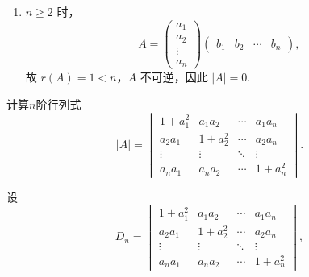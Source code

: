 \begin{exercise}
\begin{exgroup}
\begin{answer}
\begin{enumerate}
                \item $n \geqslant 2$ 时，
                    \[
                        A = \begin{pmatrix}
                            a_1 \\ a_2 \\ \vdots \\ a_n
                        \end{pmatrix} \begin{pmatrix}
                            b_1 & b_2 & \cdots & b_n
                        \end{pmatrix},
                    \]
                    故 $r(A) = 1 < n$，$A$ 不可逆，因此 $|A| = 0$.
            \end{enumerate}
        \end{answer}

        \item 计算$n$阶行列式
        \[|A|=\begin{vmatrix}
                1+a_1^2 & a_1a_2  & \cdots & a_1a_n  \\
                a_2a_1  & 1+a_2^2 & \cdots & a_2a_n  \\
                \vdots  & \vdots  & \ddots & \vdots  \\
                a_na_1  & a_na_2  & \cdots & 1+a_n^2
            \end{vmatrix}.\]
        \begin{answer}
            设
            \[
                D_n = \begin{vmatrix}
                    1+a_1^2 & a_1a_2  & \cdots & a_1a_n  \\
                    a_2a_1  & 1+a_2^2 & \cdots & a_2a_n  \\
                    \vdots  & \vdots  & \ddots & \vdots  \\
                    a_na_1  & a_na_2  & \cdots & 1+a_n^2
                \end{vmatrix},
            \]


\end{answer}
\end{exgroup}
\end{exercise}

